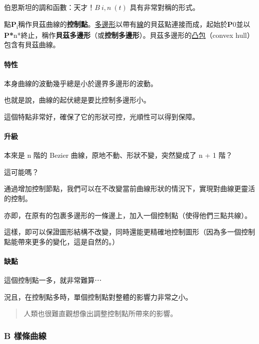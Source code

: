 \documentclass[
]{article}
\begin{document}
伯恩斯坦的調和函數：天才！\(B~i, n~(t)\) 具有非常對稱的形式。

點\textbf{P}\textsubscript{i}稱作貝茲曲線的\textbf{控制點}。\href{https://zh.wikipedia.org/wiki/多邊形}{多邊形}以帶有\href{https://zh.wikipedia.org/wiki/線}{線}的貝茲點連接而成，起始於\textbf{P}0並以\textbf{P*}n*終止，稱作\textbf{貝茲多邊形}（或\textbf{控制多邊形}）。貝茲多邊形的\href{https://zh.wikipedia.org/wiki/凸包}{凸包}（convex
hull）包含有貝茲曲線。

\hypertarget{header-n36}{%
\paragraph{特性}\label{header-n36}}

本身曲線的波動幾乎總是小於邊界多邊形的波動。

也就是說，曲線的起伏總是要比控制多邊形小。

這個特點非常好，確保了它的形狀可控，光順性可以得到保障。

\hypertarget{header-n40}{%
\paragraph{升級}\label{header-n40}}

本來是 n 階的 Bezier 曲線，原地不動、形狀不變，突然變成了 n + 1 階？

這可能嗎？

通過增加控制節點，我們可以在不改變當前曲線形狀的情況下，實現對曲線更靈活的控制。

亦即，在原有的包裹多邊形的一條邊上，加入一個控制點（使得他們三點共線）。

這樣，即可以保證圖形結構不改變，同時還能更精確地控制圖形（因為多一個控制點能帶來更多的變化，這是自然的。）

\hypertarget{header-n46}{%
\paragraph{缺點}\label{header-n46}}

這個控制點一多，就非常難算⋯

況且，在控制點多時，單個控制點對整體的影響力非常之小。

\begin{quote}
人類也很難直觀想像出調整控制點所帶來的影響。
\end{quote}

\hypertarget{header-n51}{%
\subsubsection{B 樣條曲線}\label{header-n51}}
\end{document}
